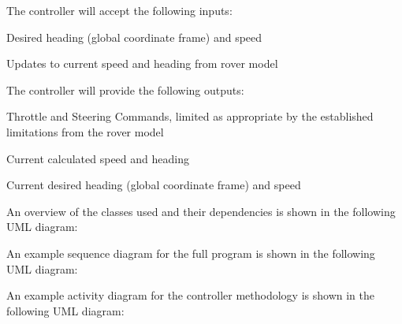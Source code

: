 The controller will accept the following inputs\+:


\begin{DoxyItemize}
\item Desired heading (global coordinate frame) and speed
\item Updates to current speed and heading from rover model
\end{DoxyItemize}

The controller will provide the following outputs\+:


\begin{DoxyItemize}
\item Throttle and Steering Commands, limited as appropriate by the established limitations from the rover model
\item Current calculated speed and heading
\item Current desired heading (global coordinate frame) and speed
\end{DoxyItemize}

An overview of the classes used and their dependencies is shown in the following U\+ML diagram\+:



An example sequence diagram for the full program is shown in the following U\+ML diagram\+:



An example activity diagram for the controller methodology is shown in the following U\+ML diagram\+:

 
